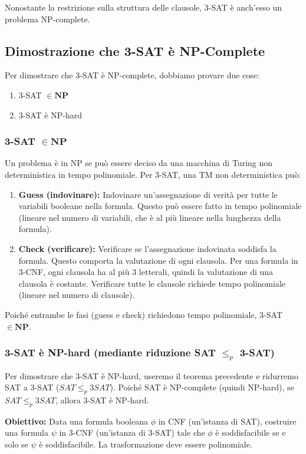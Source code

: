 \documentclass[a4paper]{article}
\theoremstyle{definition} %
\begin{document}
Nonostante la restrizione sulla struttura delle clausole, 3-SAT è anch'esso un problema NP-complete.

\subsection{Dimostrazione che 3-SAT è NP-Complete}

Per dimostrare che 3-SAT è NP-complete, dobbiamo provare due cose:
\begin{enumerate}
    \item 3-SAT $\in \mathbf{NP}$
    \item 3-SAT è NP-hard
\end{enumerate}

\subsubsection{3-SAT $\in \mathbf{NP}$}
Un problema è in NP se può essere deciso da una macchina di Turing non deterministica in tempo polinomiale.
Per 3-SAT, una TM non deterministica può:
\begin{enumerate}
    \item \textbf{Guess (indovinare):} Indovinare un'assegnazione di verità per tutte le variabili booleane nella formula. Questo può essere fatto in tempo polinomiale (lineare nel numero di variabili, che è al più lineare nella lunghezza della formula).
    \item \textbf{Check (verificare):} Verificare se l'assegnazione indovinata soddisfa la formula. Questo comporta la valutazione di ogni clausola. Per una formula in 3-CNF, ogni clausola ha al più 3 letterali, quindi la valutazione di una clausola è costante. Verificare tutte le clausole richiede tempo polinomiale (lineare nel numero di clausole).
\end{enumerate}
Poiché entrambe le fasi (guess e check) richiedono tempo polinomiale, 3-SAT $\in \mathbf{NP}$.

\subsubsection{3-SAT è NP-hard (mediante riduzione SAT $\le_p$ 3-SAT)}

Per dimostrare che 3-SAT è NP-hard, useremo il teorema precedente e ridurremo SAT a 3-SAT ($SAT \le_p 3SAT$). Poiché SAT è NP-complete (quindi NP-hard), se $SAT \le_p 3SAT$, allora 3-SAT è NP-hard.

\textbf{Obiettivo:} Data una formula booleana $\phi$ in CNF (un'istanza di SAT), costruire una formula $\psi$ in 3-CNF (un'istanza di 3-SAT) tale che $\phi$ è soddisfacibile se e solo se $\psi$ è soddisfacibile. La trasformazione deve essere polinomiale.
\end{document}
